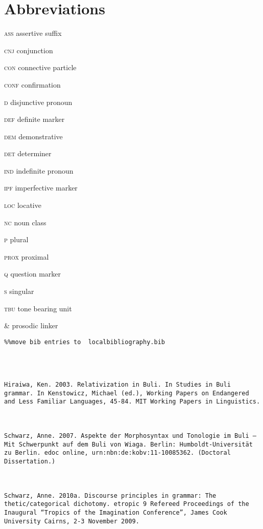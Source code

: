 \documentclass[output=paper]{langsci/langscibook}
\begin{document}
\section*{ Abbreviations}

\textsc{ass}  assertive suffix

\textsc{cnj}  conjunction

\textsc{con}  connective particle

\textsc{conf}  confirmation

\textsc{d}  disjunctive pronoun

\textsc{def}  definite marker

\textsc{dem}  demonstrative

\textsc{det}  determiner

\textsc{ind}  indefinite pronoun

\textsc{ipf}  imperfective marker

\textsc{loc}  locative

\textsc{nc}  noun class

\textsc{p}  plural

\textsc{prox}  proximal

\textsc{q}  question marker

\textsc{s}  singular

\textsc{tbu}  tone bearing unit

\& prosodic linker


\begin{verbatim}%%move bib entries to  localbibliography.bib




Hiraiwa, Ken. 2003. Relativization in Buli. In Studies in Buli grammar. In Kenstowicz, Michael (ed.), Working Papers on Endangered and Less Familiar Languages, 45-84. MIT Working Papers in Linguistics.



Schwarz, Anne. 2007. Aspekte der Morphosyntax und Tonologie im Buli – Mit Schwerpunkt auf dem Buli von Wiaga. Berlin: Humboldt-Universität zu Berlin. edoc online, urn:nbn:de:kobv:11-10085362. (Doctoral Dissertation.)



Schwarz, Anne. 2010a. Discourse principles in grammar: The thetic/categorical dichotomy. etropic 9 Refereed Proceedings of the Inaugural “Tropics of the Imagination Conference”, James Cook University Cairns, 2-3 November 2009.



\end{verbatim}
 

\printbibliography[heading=subbibliography,notkeyword=this]
\end{document}
